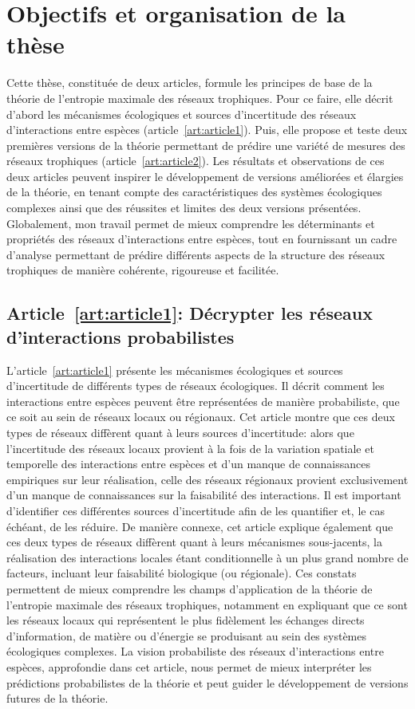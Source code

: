
\section{Objectifs et organisation de la thèse} 

Cette thèse, constituée de deux articles, formule les principes de base de la
théorie de l'entropie maximale des réseaux trophiques. Pour ce faire, elle
décrit d'abord les mécanismes écologiques et sources d'incertitude des réseaux
d'interactions entre espèces (article~\ref{art:article1}). Puis, elle propose et
teste deux premières versions de la théorie permettant de prédire une variété de
mesures des réseaux trophiques (article~\ref{art:article2}). Les résultats et
observations de ces deux articles peuvent inspirer le développement de versions
améliorées et élargies de la théorie, en tenant compte des caractéristiques des
systèmes écologiques complexes ainsi que des réussites et limites des deux
versions présentées. Globalement, mon travail permet de mieux comprendre les
déterminants et propriétés des réseaux d'interactions entre espèces, tout en
fournissant un cadre d'analyse permettant de prédire différents aspects de la
structure des réseaux trophiques de manière cohérente, rigoureuse et facilitée.

\subsection{Article~\ref{art:article1}: Décrypter les réseaux d'interactions probabilistes} 

L'article~\ref{art:article1} présente les mécanismes écologiques et sources
d'incertitude de différents types de réseaux écologiques. Il décrit comment les
interactions entre espèces peuvent être représentées de manière probabiliste,
que ce soit au sein de réseaux locaux ou régionaux. Cet article montre que ces
deux types de réseaux diffèrent quant à leurs sources d'incertitude: alors que
l'incertitude des réseaux locaux provient à la fois de la variation spatiale et
temporelle des interactions entre espèces et d'un manque de connaissances
empiriques sur leur réalisation, celle des réseaux régionaux provient
exclusivement d'un manque de connaissances sur la faisabilité des interactions.
Il est important d'identifier ces différentes sources d'incertitude afin de les
quantifier et, le cas échéant, de les réduire. De manière connexe, cet article
explique également que ces deux types de réseaux diffèrent quant à leurs
mécanismes sous-jacents, la réalisation des interactions locales étant
conditionnelle à un plus grand nombre de facteurs, incluant leur faisabilité
biologique (ou régionale). Ces constats permettent de mieux comprendre les
champs d'application de la théorie de l'entropie maximale des réseaux
trophiques, notamment en expliquant que ce sont les réseaux locaux qui
représentent le plus fidèlement les échanges directs d'information, de matière
ou d'énergie se produisant au sein des systèmes écologiques complexes. La vision
probabiliste des réseaux d'interactions entre espèces, approfondie dans cet
article, nous permet de mieux interpréter les prédictions probabilistes de la
théorie et peut guider le développement de versions futures de la théorie.

